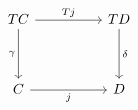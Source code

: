 \[\begin{tikzcd}
	TC && TD \\
	\\
	C && D
	\arrow["j"', from=3-1, to=3-3]
	\arrow["Tj", from=1-1, to=1-3]
	\arrow["\gamma"', from=1-1, to=3-1]
	\arrow["\delta", from=1-3, to=3-3]
\end{tikzcd}\]
